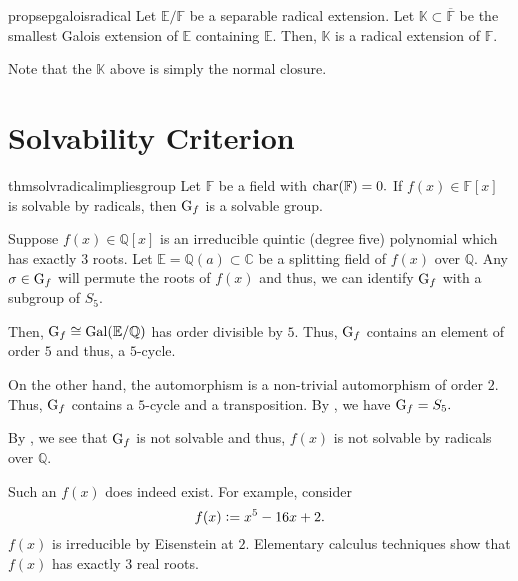 \begin{restatable}[]{prop}{sepgaloisradical}
\label{prop:sepgaloisradical}
	Let $\mathbb{E}/\mathbb{F}$ be a separable radical extension. Let $\mathbb{K} \subset \overline{\mathbb{F}}$ be the smallest Galois extension of $\mathbb{E}$ containing $\mathbb{E}.$ Then, $\mathbb{K}$ is a radical extension of $\mathbb{F}.$ \hfill\hyperref[prop:sepgaloisradical2]{\downsym}
\end{restatable}

Note that the $\mathbb{K}$ above is simply the normal closure.

\section{Solvability Criterion}

\begin{restatable}[]{thm}{solvradicalimpliesgroup}
\label{thm:solvradicalimpliesgroup}
	Let $\mathbb{F}$ be a field with $\operatorname{char}(\mathbb{F}) = 0.$ If $f(x) \in \mathbb{F}[x]$ is solvable by radicals, then $\operatorname{G}_f$ is a solvable group.  \hfill\hyperref[thm:solvradicalimpliesgroup2]{\downsym}
\end{restatable}

\begin{ex}
	Suppose $f(x) \in \mathbb{Q}[x]$ is an irreducible quintic (degree five) polynomial which has exactly $3$ roots. Let $\mathbb{E} = \mathbb{Q}(a) \subset \mathbb{C}$ be a splitting field of $f(x)$ over $\mathbb{Q}.$ Any $\sigma \in \operatorname{G}_f$ will permute the roots of $f(x)$ and thus, we can identify $\operatorname{G}_f$ with a subgroup of $S_5.$

	Then, $\operatorname{G}_f \cong \operatorname{Gal}(\mathbb{E}/\mathbb{Q})$ has order divisible by $5.$ Thus, $\operatorname{G}_f$ contains an element of order $5$ and thus, a $5$-cycle.

	On the other hand, the automorphism is a non-trivial automorphism of order $2.$ Thus, $\operatorname{G}_f$ contains a $5$-cycle and a transposition. By , we have $\operatorname{G}_f = S_5.$

	By , we see that $\operatorname{G}_f$ is not solvable and thus, $f(x)$ is not solvable by radicals over $\mathbb{Q}.$

	Such an $f(x)$ does indeed exist. For example, consider
	\begin{equation*} 
		f(x) \vcentcolon= x^5 - 16x + 2.
	\end{equation*}
	$f(x)$ is irreducible by Eisenstein at $2.$ Elementary calculus techniques show that $f(x)$ has exactly $3$ real roots.
\end{ex}

